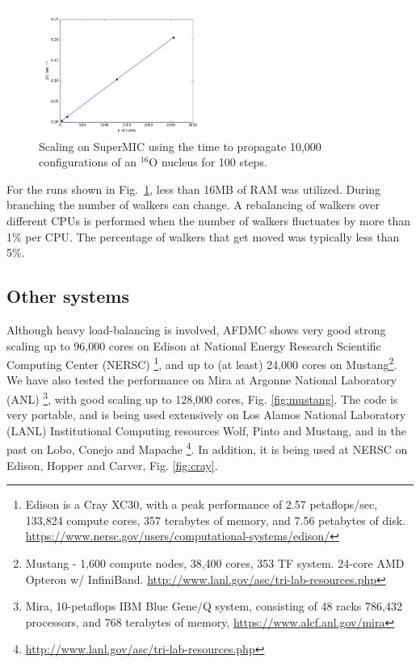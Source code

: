\documentclass[12pt,letterpaper]{article}
\begin{document}
\begin{figure}[h]
   \centering
   \includegraphics[width=0.5\textwidth]{supermic.png}
   \caption{Scaling on SuperMIC using the time to propagate 10,000 
   configurations of an $^{16}$O nucleus for 100 steps.}
   \label{fig:supermic}
\end{figure}

For the runs shown in Fig.~\ref{fig:supermic}, less than 16MB of RAM was utilized. During branching the number of walkers can change. A rebalancing of walkers over different CPUs is performed when the number of walkers fluctuates by more than 1\% per CPU. The percentage of walkers that get moved was typically less than 5\%.

\subsection{Other systems}

Although heavy load-balancing is
involved, AFDMC shows very good strong scaling up to 96,000 cores on Edison 
at National Energy Research Scientific Computing Center (NERSC)
\footnote{Edison is a Cray XC30, with a peak performance of 2.57 
petaflops/sec, 133,824 compute cores, 357 terabytes of memory, and 7.56 
petabytes of disk.
\url{https://www.nersc.gov/users/computational-systems/edison/}
}, and
up to (at least) 24,000 cores on Mustang\footnote{
Mustang - 1,600 compute nodes, 38,400 cores, 353 TF system. 24-core AMD 
Opteron w/ InfiniBand. \url{http://www.lanl.gov/asc/tri-lab-resources.php}
}. 
We have also tested the performance on Mira at Argonne National Laboratory 
(ANL)
\footnote{
Mira, 10-petaflops IBM Blue Gene/Q system, consisting of 48 racks 786,432 
processors, and 768 terabytes of memory,
\url{https://www.alcf.anl.gov/mira}
}, with good scaling up to 128,000 cores, Fig. \ref{fig:mustang}. The code 
is very portable, and is being used extensively on Los Alamos National 
Laboratory (LANL) Institutional 
Computing resources
Wolf, Pinto and Mustang, and in the past on Lobo, Conejo and Mapache
\footnote{\url{http://www.lanl.gov/asc/tri-lab-resources.php}}.
In addition, it is being used at NERSC on Edison, Hopper and Carver, Fig. 
\ref{fig:cray}.
\end{document}
